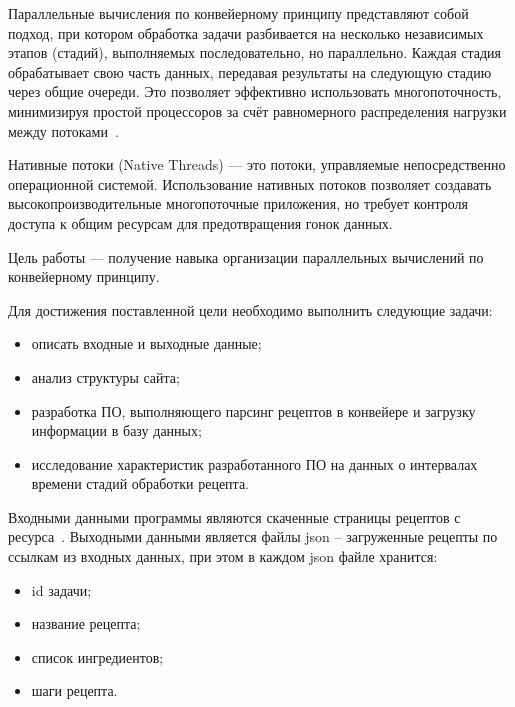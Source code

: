 

Параллельные вычисления по конвейерному принципу представляют собой подход,
при котором обработка задачи разбивается на несколько независимых этапов (стадий),
выполняемых последовательно, но параллельно. Каждая стадия обрабатывает свою часть данных,
передавая результаты на следующую стадию через общие очереди.
Это позволяет эффективно использовать многопоточность,
минимизируя простой процессоров за счёт равномерного распределения
нагрузки между потоками~\cite{paralel_cpp}.

Нативные потоки (Native Threads) — это потоки, управляемые непосредственно операционной системой.
Использование нативных потоков позволяет создавать высокопроизводительные многопоточные приложения,
но требует контроля доступа к общим ресурсам для предотвращения гонок данных.

Цель работы --- получение навыка организации параллельных вычислений по конвейерному принципу.

Для достижения поставленной цели необходимо выполнить следующие задачи:
\begin{itemize}
    \item описать входные и выходные данные;
    \item анализ структуры сайта;
    \item разработка ПО, выполняющего парсинг рецептов в конвейере и загрузку информации в базу данных;
    \item исследование характеристик разработанного ПО на данных о интервалах времени стадий обработки рецепта.
\end{itemize}


Входными данными программы являются скаченные страницы рецептов с ресурса~\cite{recepies}.
Выходными данными является файлы json -- загруженные рецепты по ссылкам из входных данных, при этом в каждом json файле хранится:

\begin{itemize}
    \item id задачи;
    \item название рецепта;
    \item список ингредиентов;
    \item шаги рецепта.
\end{itemize}



